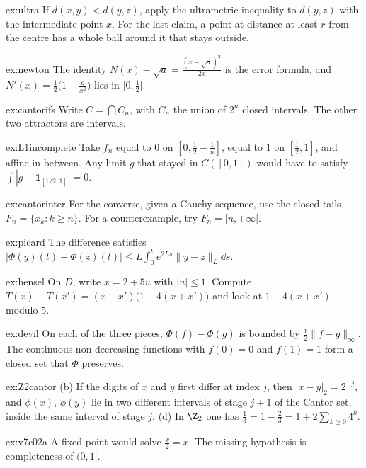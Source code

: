 \begin{hint}{ex:ultra}
If $d(x,y)<d(y,z)$, apply the ultrametric inequality to $d(y,z)$ with the intermediate point $x$. For the last claim, a point at distance at least $r$ from the centre has a whole ball around it that stays outside.
\end{hint}
\begin{hint}{ex:newton}
The identity $N(x)-\sqrt a=\frac{(x-\sqrt a)^2}{2x}$ is the error formula, and $N'(x)=\frac12\bigl(1-\frac a{x^2}\bigr)$ lies in $[0,\frac12[$.
\end{hint}
\begin{hint}{ex:cantorifs}
Write $C=\bigcap C_n$, with $C_n$ the union of $2^n$ closed intervals. The other two attractors are intervals.
\end{hint}
\begin{hint}{ex:L1incomplete}
Take $f_n$ equal to $0$ on $[0,\frac12-\frac1n]$, equal to $1$ on $[\frac12,1]$, and affine in between. Any limit $g$ that stayed in $C([0,1])$ would have to satisfy $\int|g-\mathbf 1_{[1/2,1]}|=0$.
\end{hint}
\begin{hint}{ex:cantorinter}
For the converse, given a Cauchy sequence, use the closed tails $F_n=\overline{\{x_k:k\ge n\}}$. For a counterexample, try $F_n=[n,+\infty[$.
\end{hint}
\begin{hint}{ex:picard}
The difference satisfies $|\Phi(y)(t)-\Phi(z)(t)|\le L\int_0^te^{2Ls}\|y-z\|_L\dd s$.
\end{hint}
\begin{hint}{ex:hensel}
On $D$, write $x=2+5u$ with $|u|\le1$. Compute $T(x)-T(x')=(x-x')\bigl(1-4(x+x')\bigr)$ and look at $1-4(x+x')$ modulo $5$.
\end{hint}
\begin{hint}{ex:devil}
On each of the three pieces, $\Phi(f)-\Phi(g)$ is bounded by $\frac12\|f-g\|_\infty$. The continuous non-decreasing functions with $f(0)=0$ and $f(1)=1$ form a closed set that $\Phi$ preserves.
\end{hint}
\begin{hint}{ex:Z2cantor}
(b) If the digits of $x$ and $y$ first differ at index $j$, then $|x-y|_2=2^{-j}$, and $\phi(x)$, $\phi(y)$ lie in two different intervals of stage $j+1$ of the Cantor set, inside the same interval of stage $j$. (d) In $\Z_2$ one has $\frac13=1-\frac23=1+2\sum_{k\ge0}4^k$.
\end{hint}
\begin{hint}{ex:v7c02a}
A fixed point would solve $\frac x2=x$. The missing hypothesis is completeness of $(0,1]$.
\end{hint}
